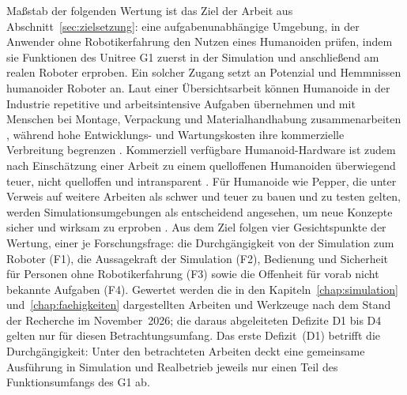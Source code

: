 Maßstab der folgenden Wertung ist das Ziel der Arbeit aus Abschnitt~\ref{sec:zielsetzung}: eine aufgabenunabhängige Umgebung, in der Anwender ohne Robotikerfahrung den Nutzen eines Humanoiden prüfen, indem sie Funktionen des Unitree G1 zuerst in der Simulation und anschließend am realen Roboter erproben.
Ein solcher Zugang setzt an Potenzial und Hemmnissen humanoider Roboter an.
Laut einer Übersichtsarbeit können Humanoide in der Industrie repetitive und arbeitsintensive Aufgaben übernehmen und mit Menschen bei Montage, Verpackung und Materialhandhabung zusammenarbeiten \cite{Tong2024}, während hohe Entwicklungs- und Wartungskosten ihre kommerzielle Verbreitung begrenzen \cite{Tong2024}.
Kommerziell verfügbare Humanoid-Hardware ist zudem nach Einschätzung einer Arbeit zu einem quelloffenen Humanoiden überwiegend teuer, nicht quelloffen und intransparent \cite{Chi2025}.
Für Humanoide wie Pepper, die unter Verweis auf weitere Arbeiten als schwer und teuer zu bauen und zu testen gelten, werden Simulationsumgebungen als entscheidend angesehen, um neue Konzepte sicher und wirksam zu erproben \cite{Sekkat2024}.
Aus dem Ziel folgen vier Gesichtspunkte der Wertung, einer je Forschungsfrage: die Durchgängigkeit von der Simulation zum Roboter (F1), die Aussagekraft der Simulation (F2), Bedienung und Sicherheit für Personen ohne Robotikerfahrung (F3) sowie die Offenheit für vorab nicht bekannte Aufgaben (F4).
Gewertet werden die in den Kapiteln~\ref{chap:simulation} und~\ref{chap:faehigkeiten} dargestellten Arbeiten und Werkzeuge nach dem Stand der Recherche im November~2026; die daraus abgeleiteten Defizite D1 bis D4 gelten nur für diesen Betrachtungsumfang.
%
Das erste Defizit~(D1) betrifft die Durchgängigkeit: Unter den betrachteten Arbeiten deckt eine gemeinsame Ausführung in Simulation und Realbetrieb jeweils nur einen Teil des Funktionsumfangs des G1 ab.
